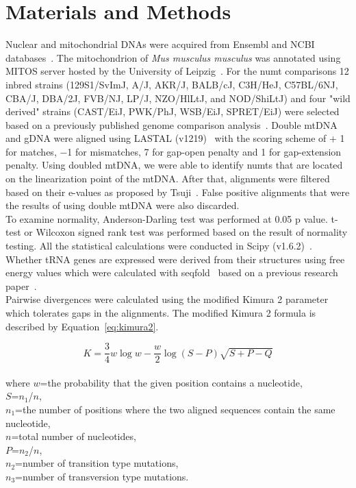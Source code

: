 \documentclass[a4paper,12pt]{article}
\numberwithin{equation}{section} %
\begin{document}
\section{Materials and Methods}
\indent Nuclear and mitochondrial DNAs were acquired from Ensembl and NCBI databases~. The mitochondrion of \textit{Mus musculus musculus} was annotated using MITOS server hosted by the University of Leipzig~. For the numt comparisons 12 inbred strains (129S1/SvImJ, A/J, AKR/J, BALB/cJ, C3H/HeJ, C57BL/6NJ, CBA/J, DBA/2J, FVB/NJ, LP/J, NZO/HlLtJ, and NOD/ShiLtJ) and four "wild derived" strains (CAST/EiJ, PWK/PhJ, WSB/EiJ, SPRET/EiJ) were selected based on a previously published genome comparison analysis~. Double mtDNA and gDNA were aligned using LASTAL (v1219)~ with the scoring scheme of + 1 for matches, −1 for mismatches, 7 for gap-open penalty and 1 for gap-extension penalty. Using doubled mtDNA, we were able to identify numts that are located on the linearization point of the mtDNA. After that, alignments were filtered based on their e-values as proposed by Tsuji~.  False positive alignments that were the results of using double mtDNA were also discarded.\\ \indent To examine normality, Anderson-Darling test was performed at 0.05 p value. t-test or Wilcoxon signed rank test was performed based on the result of normality testing. All the statistical calculations were conducted in Scipy (v1.6.2)~. Whether tRNA genes are expressed were derived from their structures using free energy values which were calculated with seqfold~ based on a previous research paper~. \\ Pairwise divergences were calculated using the modified Kimura 2 parameter~ which tolerates gaps in the alignments. The modified Kimura 2 formula is described by Equation~\ref{eq:kimura2}.

\begin{equation}\label{eq:kimura2}
	K=\frac{3}{4}w\log w- \frac{w}{2} \log (S-P) \sqrt{S+P-Q}
\end{equation}\\
where $w$=the probability that the given position contains a nucleotide,\\
$S$=$n_1$/$n$,\\
$n_1$=the number of positions where the two aligned sequences contain the same nucleotide,\\
$n$=total number of nucleotides,\\
$P$=$n_2$/$n$,\\
$n_2$=number of transition type mutations,\\
$n_3$=number of transversion type mutations.\\
\end{document}
